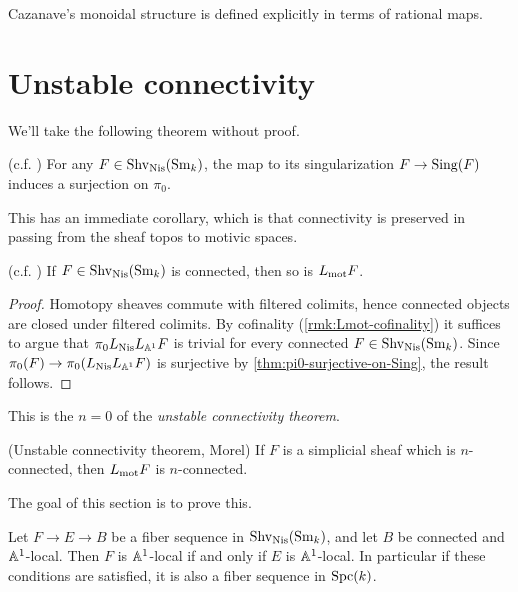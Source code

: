 \documentclass[11pt,openany]{book}
\begin{document}
Cazanave's monoidal structure is defined explicitly in terms of rational maps.


\section{Unstable connectivity}

We'll take the following theorem without proof.

\begin{theorem}\label{thm:pi0-surjective-on-Sing} 
\cite[\S.3.22~(p.94)]{MV} (c.f. \cite[2.7]{AD-excision})
For any $F\in \mathrm{Shv}_{\mathrm{Nis}}(\mathrm{Sm}_k)$, the map to its singularization $F \to \mathrm{Sing}(F)$ induces a surjection on $\pi_0$.
\end{theorem}

This has an immediate corollary, which is that connectivity is preserved in passing from the sheaf topos to motivic spaces.

\begin{corollary}\label{cor:unstable-connectivity-0} 
(c.f. \cite[1.2]{bachmannstrongly}) If $F\in \mathrm{Shv}_{\mathrm{Nis}}(\mathrm{Sm}_k)$ is connected, then so is $L_{\mathrm{mot}} F$.
\end{corollary}
\begin{proof} Homotopy sheaves commute with filtered colimits, hence connected objects are closed under filtered colimits. By cofinality (\autoref{rmk:Lmot-cofinality}) it suffices to argue that $\pi_0 L_{\mathrm{Nis}} L_{\mathbb{A}^1}F$ is trivial for every connected $F \in \mathrm{Shv}_{\mathrm{Nis}}(\mathrm{Sm}_k)$. Since $\pi_0(F) \to \pi_0(L_{\mathrm{Nis}} L_{\mathbb{A}^1} F)$ is surjective by \autoref{thm:pi0-surjective-on-Sing}, the result follows.
\end{proof}

This is the $n=0$ of the \textit{unstable connectivity theorem}.


\begin{theorem}\label{thm:unstable-connectivity}
(Unstable connectivity theorem, Morel) If $F$ is a simplicial sheaf which is $n$-connected, then $L_{\mathrm{mot}} F$ is $n$-connected.
\end{theorem}

The goal of this section is to prove this.

\begin{lemma}\label{lem:fiber-seq-a1-local} \cite[1.9]{bachmannstrongly}
Let $F \to E \to B$ be a fiber sequence in $\mathrm{Shv}_{\mathrm{Nis}}(\mathrm{Sm}_k)$, and let $B$ be connected and $\mathbb{A}^1$-local. Then $F$ is $\mathbb{A}^1$-local if and only if $E$ is $\mathbb{A}^1$-local. In particular if these conditions are satisfied, it is also a fiber sequence in $\mathrm{Spc}(k)$.
\end{lemma}
\end{document}
